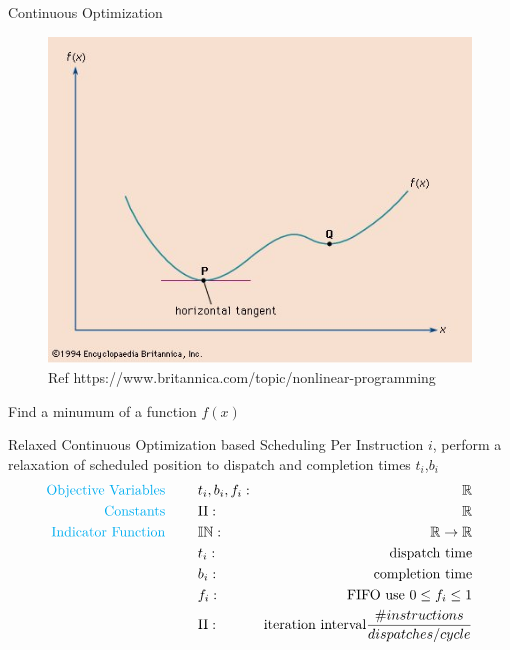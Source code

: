 \documentclass{beamer}
\begin{document}
\begin{darkframes}
\begin{frame}{Continuous Optimization}

  \begin{figure}
    \includegraphics[scale=0.4]{figures/optimization.jpg}
    \caption{Ref https://www.britannica.com/topic/nonlinear-programming}
  \end{figure}
  Find a minumum of a function $f(x)$

\end{frame}

\begin{frame}{Relaxed Continuous Optimization based Scheduling}
    Per Instruction $i$, perform a relaxation of scheduled position to dispatch and completion times $t_i$,$b_i$
    \begin{align*}
    \text{\color{cyan} Objective Variables \qquad} & t_i, b_i, f_i:& \mathbb{R} \\
    \text{\color{cyan} Constants \qquad} & \textrm{II} :& \mathbb{R} \\
    \text{\color{cyan} Indicator Function \qquad} & \mathbb{IN} :& \mathbb{R} \rightarrow \mathbb{R} \\
    & t_i :& \text{dispatch time} \\
    & b_i :& \text{completion time} \\
    & f_i :& \text{FIFO use } 0 \leq f_i \leq 1 \\
    & \textrm{II} :& \text{iteration interval} \frac{\# instructions}{dispatches/cycle} \\
    \end{align*}
   
\end{frame}


\end{darkframes}
\end{document}
